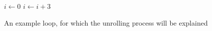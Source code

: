\begin{figure}[H]
	\begin{algorithmic}
		\State $i \gets 0$
			\State {}
			\State $i \gets i + 3$
		\EndWhile
	\end{algorithmic}
	\caption{An example loop, for which the unrolling process will be explained}\label{fig:impl:fixup:fixup-firm-loop}
\end{figure}